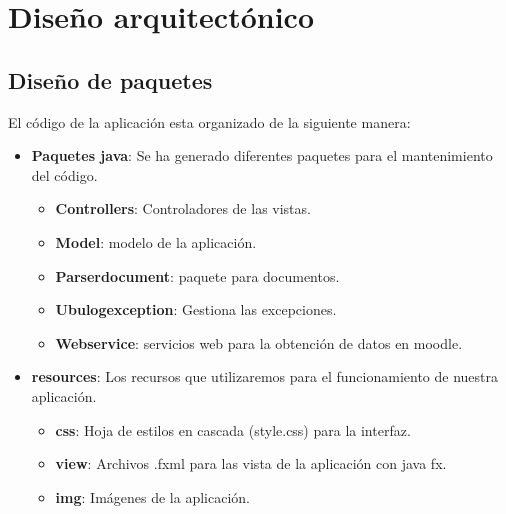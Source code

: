 \section{Diseño arquitectónico}

\subsection{Diseño de paquetes}

El código de la aplicación esta organizado de la siguiente manera:

\begin{itemize}
	\tightlist
	\item
	\textbf{Paquetes java}: Se ha generado diferentes paquetes para el mantenimiento del código.
	\begin{itemize}
		\tightlist
		\item
		\textbf{Controllers}: Controladores de las vistas.
		
		
		\item
		\textbf{Model}: modelo de la aplicación.
		
		
		\item
		\textbf{Parserdocument}: paquete para documentos.
		
		\item
		\textbf{Ubulogexception}: Gestiona las excepciones.
		
		\item
		\textbf{Webservice}: servicios web para la obtención de datos en moodle.
		
		
	\end{itemize}
	\item
	\textbf{resources}: Los recursos que utilizaremos para el funcionamiento de nuestra aplicación.
	\begin{itemize}
		\tightlist
		\item
		\textbf{css}: Hoja de estilos en cascada (style.css) para la interfaz.
		\item
		\textbf{view}: Archivos .fxml para las vista de la aplicación con java fx.
		
		\item
		\textbf{img}: Imágenes de la aplicación.
		
		
	\end{itemize}
	
\end{itemize}

